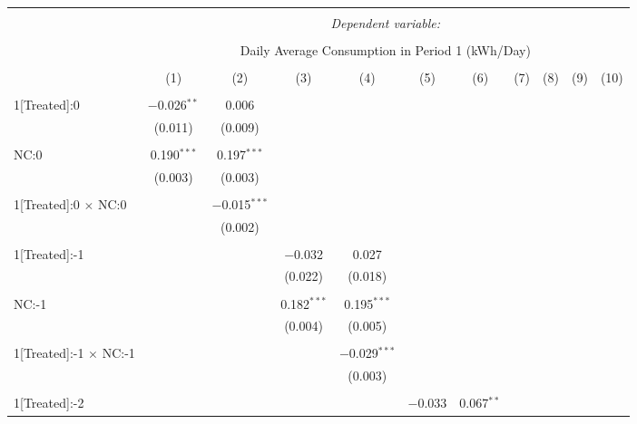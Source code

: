 
\begin{table}[!htbp] \centering 
  \caption{} 
  \label{} 
\footnotesize 
\begin{tabular}{@{\extracolsep{5pt}}lcccccccccc} 
\\[-1.8ex]\hline 
\hline \\[-1.8ex] 
 & \multicolumn{10}{c}{\textit{Dependent variable:}} \\ 
\cline{2-11} 
\\[-1.8ex] & \multicolumn{10}{c}{Daily Average Consumption in Period 1 (kWh/Day)} \\ 
\\[-1.8ex] & (1) & (2) & (3) & (4) & (5) & (6) & (7) & (8) & (9) & (10)\\ 
\hline \\[-1.8ex] 
 1[Treated]:0 & $-$0.026$^{**}$ & 0.006 &  &  &  &  &  &  &  &  \\ 
  & (0.011) & (0.009) &  &  &  &  &  &  &  &  \\ 
  & & & & & & & & & & \\ 
 NC:0 & 0.190$^{***}$ & 0.197$^{***}$ &  &  &  &  &  &  &  &  \\ 
  & (0.003) & (0.003) &  &  &  &  &  &  &  &  \\ 
  & & & & & & & & & & \\ 
 1[Treated]:0 $\times$ NC:0 &  & $-$0.015$^{***}$ &  &  &  &  &  &  &  &  \\ 
  &  & (0.002) &  &  &  &  &  &  &  &  \\ 
  & & & & & & & & & & \\ 
 1[Treated]:-1 &  &  & $-$0.032 & 0.027 &  &  &  &  &  &  \\ 
  &  &  & (0.022) & (0.018) &  &  &  &  &  &  \\ 
  & & & & & & & & & & \\ 
 NC:-1 &  &  & 0.182$^{***}$ & 0.195$^{***}$ &  &  &  &  &  &  \\ 
  &  &  & (0.004) & (0.005) &  &  &  &  &  &  \\ 
  & & & & & & & & & & \\ 
 1[Treated]:-1 $\times$ NC:-1 &  &  &  & $-$0.029$^{***}$ &  &  &  &  &  &  \\ 
  &  &  &  & (0.003) &  &  &  &  &  &  \\ 
  & & & & & & & & & & \\ 
 1[Treated]:-2 &  &  &  &  & $-$0.033 & 0.067$^{**}$ &  &  &  &  \\ 

\end{tabular}
\end{table}
